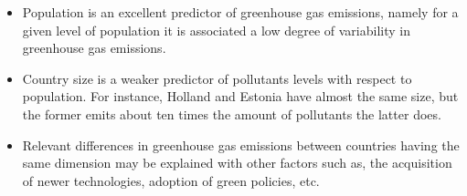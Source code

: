 \documentclass[a4paper]{article}
\begin{document}
\begin{center}

\begin{itemize}
\item Population is an excellent predictor of greenhouse gas emissions, namely for a given level of population it is associated a low degree of variability in greenhouse gas emissions. 
\item Country size is a weaker predictor of pollutants levels with respect to population. For instance, Holland and Estonia have almost the same size, but the former emits about ten times the amount of pollutants the latter does.
\item Relevant differences in greenhouse gas emissions between countries having the same dimension may be explained with other factors such as, the acquisition of newer technologies, adoption of green policies, etc.

\end{itemize}


\end{center}
\end{document}
